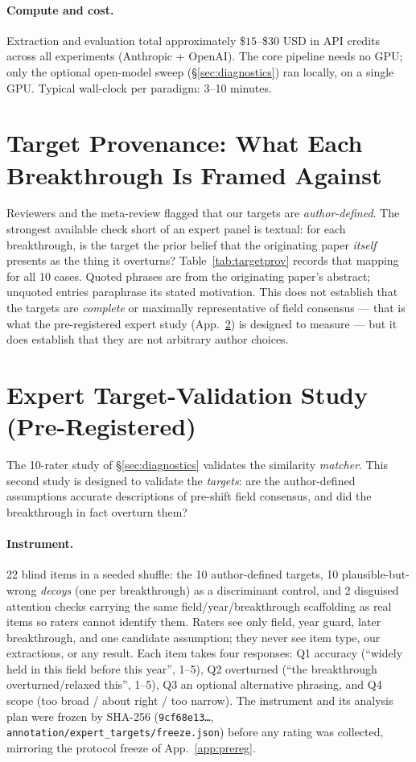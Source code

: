 \documentclass[11pt]{article}
\newcommand{\fpath}[1]{\mbox{}\nolinkurl{#1}}
\begin{document}
\paragraph{Compute and cost.} Extraction and evaluation total approximately \$$15$--\$$30$ USD in API credits across all experiments (Anthropic + OpenAI). The core pipeline needs no GPU; only the optional open-model sweep (\S\ref{sec:diagnostics}) ran locally, on a single GPU. Typical wall-clock per paradigm: 3--10 minutes.

\section{Target Provenance: What Each Breakthrough Is Framed Against}\label{app:targetprov}

Reviewers and the meta-review flagged that our targets are \emph{author-defined}. The strongest
available check short of an expert panel is textual: for each breakthrough, is the target the
prior belief that the originating paper \emph{itself} presents as the thing it overturns?
Table~\ref{tab:targetprov} records that mapping for all 10 cases. Quoted phrases are from the
originating paper's abstract; unquoted entries paraphrase its stated motivation. This does not
establish that the targets are \emph{complete} or maximally representative of field consensus ---
that is what the pre-registered expert study (App.~\ref{app:targetvalidity}) is designed to measure --- but it does establish
that they are not arbitrary author choices.

\section{Expert Target-Validation Study (Pre-Registered)}\label{app:targetvalidity}

The 10-rater study of \S\ref{sec:diagnostics} validates the similarity \emph{matcher}. This
second study is designed to validate the \emph{targets}: are the author-defined assumptions accurate
descriptions of pre-shift field consensus, and did the breakthrough in fact overturn them?

\paragraph{Instrument.} 22 blind items in a seeded shuffle: the 10 author-defined targets, 10
plausible-but-wrong \emph{decoys} (one per breakthrough) as a discriminant control, and 2
disguised attention checks carrying the same field/year/breakthrough scaffolding as real items so
raters cannot identify them. Raters see only field, year guard, later breakthrough, and one
candidate assumption; they never see item type, our extractions, or any result. Each item takes
four responses: Q1 accuracy (``widely held in this field before this year'', 1--5), Q2 overturned
(``the breakthrough overturned/relaxed this'', 1--5), Q3 an optional alternative phrasing, and Q4
scope (too broad / about right / too narrow). The instrument and its analysis plan were frozen by
SHA-256 (\texttt{9cf68e13\ldots}, \fpath{annotation/expert_targets/freeze.json}) before any rating
was collected, mirroring the protocol freeze of App.~\ref{app:prereg}.
\end{document}
